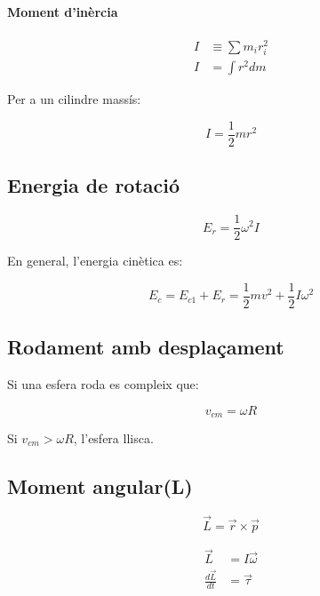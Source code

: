 \paragraph{Moment d'inèrcia}

\begin{align}
    I &\equiv \sum m_i r_i^2 \\
    I &= \int r^2 dm
\end{align}

Per a un cilindre massís:

\begin{equation}
    I = \frac{1}{2}mr^2
\end{equation}

\subsection{Energia de rotació}
\label{sub:energia_de_rotacio}

\begin{equation}
    E_r = \frac{1}{2}\omega^2I
\end{equation}

En general, l'energia cinètica es:

\begin{equation}
    E_c = E_{c1} + E_r = \frac{1}{2} m v^2 + \frac{1}{2}I\omega^2
\end{equation}

\subsection{Rodament amb desplaçament}
\label{sub:rodament_amb_desplacament}

Si una esfera roda es compleix que:

\begin{equation}
    v_{cm} = \omega R
\end{equation}

Si $v_{cm} > \omega R$, l'esfera llisca.

\subsection{Moment angular(L)}
\label{sub:moment_angular}

\begin{equation}
    \vec{L} = \vec{r} \times \vec{p}
\end{equation}

\begin{align}
    \vec{L} &= I \vec{\omega} \\
    \frac{d\vec{L}}{dt} &= \vec{\tau}
\end{align}

